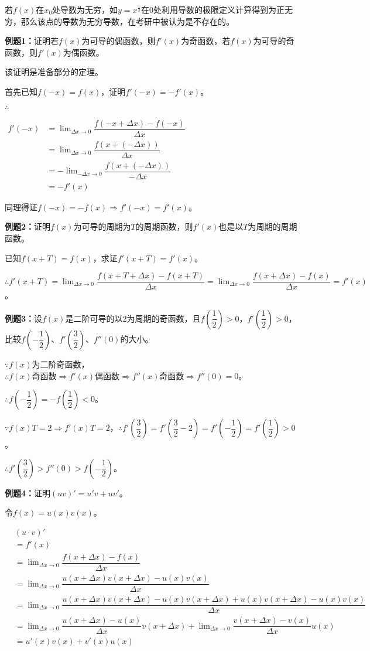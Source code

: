 \documentclass[UTF8, 12pt]{ctexart}
\begin{document}
若$f(x)$在$x_0$处导数为无穷，如$y=x^{\frac{1}{3}}$在$0$处利用导数的极限定义计算得到为正无穷，那么该点的导数为无穷导数，在考研中被认为是不存在的。

\textbf{例题1：}证明若$f(x)$为可导的偶函数，则$f'(x)$为奇函数，若$f(x)$为可导的奇函数，则$f'(x)$为偶函数。

该证明是准备部分的定理。

首先已知$f(-x)=f(x)$，证明$f'(-x)=-f'(x)$。

$\therefore$

$
\begin{aligned}
    f'(-x) &=\lim_{\Delta x\to 0}\dfrac{f(-x+\Delta x)-f(-x)}{\Delta x} \\
    & =\lim_{\Delta x\to 0}\dfrac{f(x+(-\Delta x))}{\Delta x} \\
    & =-\lim_{-\Delta x\to 0}\dfrac{f(x+(-\Delta x))}{-\Delta x} \\
    & =-f'(x)
\end{aligned}
$

同理得证$f(-x)=-f(x)\Rightarrow f'(-x)=f'(x)$。

\textbf{例题2：}证明$f(x)$为可导的周期为$T$的周期函数，则$f'(x)$也是以$T$为周期的周期函数。

已知$f(x+T)=f(x)$，求证$f'(x+T)=f'(x)$。

$\therefore f'(x+T)=\lim_{\Delta x\to 0}\dfrac{f(x+T+\Delta x)-f(x+T)}{\Delta x}=\lim_{\Delta x\to 0}\dfrac{f(x+\Delta x)-f(x)}{\Delta x}=f'(x)$。

\textbf{例题3：}设$f(x)$是二阶可导的以2为周期的奇函数，且$f(\dfrac{1}{2})>0$，$f'(\dfrac{1}{2})>0$，比较$f(-\dfrac{1}{2})$、$f'(\dfrac{3}{2})$、$f''(0)$的大小。

$\because f(x)$为二阶奇函数，$\therefore f(x)\text{奇函数}\Rightarrow f'(x)\text{偶函数}\Rightarrow f''(x)\text{奇函数}\Rightarrow f''(0)=0$。

$\therefore f(-\dfrac{1}{2})=-f(\dfrac{1}{2})<0$。

$\because f(x)T=2\Rightarrow f'(x)T=2$，$\therefore f'(\dfrac{3}{2})=f'(\dfrac{3}{2}-2)=f'(-\dfrac{1}{2})=f'(\dfrac{1}{2})>0$。

$\therefore f'(\dfrac{3}{2})>f''(0)>f(-\dfrac{1}{2})$。

\textbf{例题4：}证明$(uv)'=u'v+uv'$。

令$f(x)=u(x)v(x)$。

$
\begin{aligned}
    & (u\cdot v)' \\
    & =f'(x) \\
    & =\lim_{\Delta x\to 0}\dfrac{f(x+\Delta x)-f(x)}{\Delta x} \\
    & =\lim_{\Delta x\to 0}\dfrac{u(x+\Delta x)v(x+\Delta x)-u(x)v(x)}{\Delta x} \\
    & =\lim_{\Delta x\to 0}\dfrac{u(x+\Delta x)v(x+\Delta x)-u(x)v(x+\Delta x)+u(x)v(x+\Delta x)-u(x)v(x)}{\Delta x} \\
    & =\lim_{\Delta x\to 0}\dfrac{u(x+\Delta x)-u(x)}{\Delta x}v(x+\Delta x) +\lim_{\Delta x\to 0}\dfrac{v(x+\Delta x)-v(x)}{\Delta x}u(x) \\
    & =u'(x)v(x)+v'(x)u(x)
\end{aligned}
$
\end{document}
